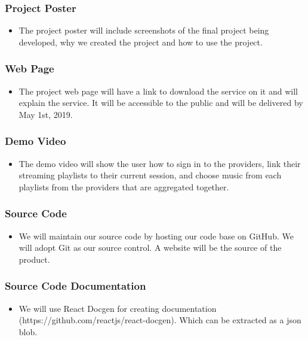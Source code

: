 \subsubsection{Project Poster}
\begin{itemize}
  \item The project poster will include screenshots of the final project being developed, why we created the project and how to use the project.
\end{itemize}

\subsubsection{Web Page}
\begin{itemize}
  \item The project web page will have a link to download the service on it and will explain the service. It will be accessible to the public and will be delivered by May 1st, 2019.
\end{itemize}

\subsubsection{Demo Video}
\begin{itemize}
  \item The demo video will show the user how to sign in to the providers, link their streaming playlists to their current session, and choose music from each playlists from the providers that are aggregated together.
\end{itemize}

\subsubsection{Source Code}
\begin{itemize}
  \item We will maintain our source code by hosting our code base on GitHub. We will adopt Git as our source control. A website will be the source of the product.
\end{itemize}

\subsubsection{Source Code Documentation}
\begin{itemize}
  \item We will use React Docgen for creating documentation (https://github.com/reactjs/react-docgen). Which can be extracted as a json blob.
\end{itemize}


